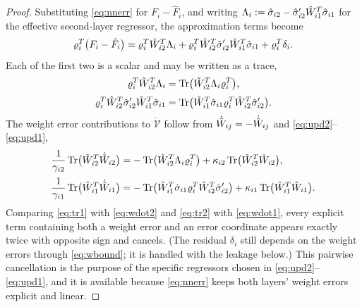 \begin{proof}
Substituting \eqref{eq:nnerr} for $F_i-\hat F_i$, and writing
$\Lambda_i:=\hat\sigma_{i2}-\hat\sigma_{i2}'\hat{W}_{i1}^T\hat\sigma_{i1}$ for the
effective second-layer regressor, the approximation terms become
\begin{equation}\label{eq:approxterms}
\varrho_i^T\bigl(F_i-\hat F_i\bigr)
=\varrho_i^T\tilde{W}_{i2}^T\Lambda_i
+\varrho_i^T\hat{W}_{i2}^T\hat\sigma_{i2}'\tilde{W}_{i1}^T\hat\sigma_{i1}
+\varrho_i^T\delta_i .
\end{equation}
Each of the first two is a scalar and may be written as a trace,
\begin{align}
\varrho_i^T\tilde{W}_{i2}^T\Lambda_i
&=\operatorname{Tr}\bigl(\tilde{W}_{i2}^T\Lambda_i\varrho_i^T\bigr),\label{eq:tr1}\\[2pt]
\varrho_i^T\hat{W}_{i2}^T\hat\sigma_{i2}'\tilde{W}_{i1}^T\hat\sigma_{i1}
&=\operatorname{Tr}\bigl(\tilde{W}_{i1}^T\hat\sigma_{i1}\varrho_i^T\hat{W}_{i2}^T\hat\sigma_{i2}'\bigr).
\label{eq:tr2}
\end{align}
The weight error contributions to $\dot{\mathcal{V}}$ follow from
$\dot{\tilde{W}}_{ij}=-\dot{\hat{W}}_{ij}$ and \eqref{eq:upd2}--\eqref{eq:upd1},
\begin{align}
\frac{1}{\gamma_{i2}}\operatorname{Tr}\bigl(\tilde{W}_{i2}^T\dot{\tilde{W}}_{i2}\bigr)
&=-\operatorname{Tr}\bigl(\tilde{W}_{i2}^T\Lambda_i\varrho_i^T\bigr)
+\kappa_{i2}\operatorname{Tr}\bigl(\tilde{W}_{i2}^T\hat{W}_{i2}\bigr),\label{eq:wdot2}\\[2pt]
\frac{1}{\gamma_{i1}}\operatorname{Tr}\bigl(\tilde{W}_{i1}^T\dot{\tilde{W}}_{i1}\bigr)
&=-\operatorname{Tr}\bigl(\tilde{W}_{i1}^T\hat\sigma_{i1}\varrho_i^T\hat{W}_{i2}^T\hat\sigma_{i2}'\bigr)
+\kappa_{i1}\operatorname{Tr}\bigl(\tilde{W}_{i1}^T\hat{W}_{i1}\bigr).\label{eq:wdot1}
\end{align}
Comparing \eqref{eq:tr1} with \eqref{eq:wdot2} and \eqref{eq:tr2} with
\eqref{eq:wdot1}, every explicit term containing both a weight error and an
error coordinate appears exactly twice with opposite sign and cancels. (The
residual $\delta_i$ still depends on the weight errors through \eqref{eq:wbound};
it is handled with the leakage below.) This pairwise cancellation is the
purpose of the specific regressors chosen in \eqref{eq:upd2}--\eqref{eq:upd1},
and it is available because \eqref{eq:nnerr} keeps both layers' weight errors
explicit and linear.


\end{proof}
